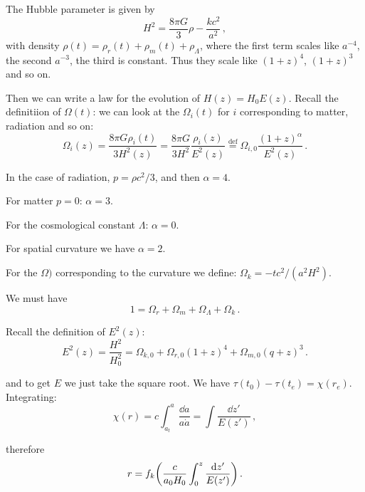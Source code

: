 \documentclass[main.tex]{subfiles}
\begin{document}

The Hubble parameter is given by 
%
\begin{equation}
  H^2= \frac{8 \pi G}{3} \rho - \frac{k c^2}{a^2}
\,,
\end{equation}
%
with density \(\rho (t) = \rho _r (t) + \rho _m (t) + \rho _\Lambda \), where the first term scales like \(a^{-4}\), the second \(a^{-3}\), the third is constant. Thus they scale like \((1+z)^{4}\), \((1+z)^{3}\) and so on.

Then we can write a law for the evolution of \(H(z) = H_0 E(z)\).
Recall the definitiion of \(\Omega (t)\): we can look at the \(\Omega_i (t)\) for \(i\) corresponding to matter, radiation and so on: 
%
\begin{equation}
  \Omega _i (z) = \frac{8 \pi G \rho _i (t)}{3 H^2(z)}
  = \frac{8 \pi G }{3 H^2} \frac{\rho _i (z)}{E^2(z)}
  \overset{\text{def}}{=} \Omega _{i,0} \frac{(1+z)^{\alpha }}{E^2(z)}
\,.
\end{equation}

In the case of radiation, \(p = \rho c^2 /3\), and then \(\alpha = 4\). 

For matter \(p=0\): \(\alpha = 3\).

For the cosmological constant \(\Lambda \): \(\alpha =0\).

For spatial curvature we have \(\alpha = 2\).

For the \(\Omega )\) corresponding to the curvature we define: \(\Omega _k = - t c^2/(a^2 H^2)\).

We must have 
%
\begin{equation}
  1 = \Omega _r + \Omega _m + \Omega _\Lambda + \Omega _k
\,.
\end{equation}

Recall the definition of \(E^2(z)\): 
%
\begin{equation}
  E^2(z) = \frac{H^2}{H_0^2} = 
  \Omega _{k, 0} + \Omega_{r, 0} (1+z)^4 + \Omega_{m, 0} (q+z)^{3}
\,.
\end{equation}

and to get \(E\) we just take the square root.
We have \(\tau (t_0 ) - \tau (t_e) = \chi (r_e)\).
Integrating: 
%
\begin{equation}
  \chi (r) = c \int_{a_t}^{a} \frac{\dd{a}  }{a \dot{a} }
  = \int \frac{\dd{z'} }{E(z')}
\,,
\end{equation}
%

therefore 
%
\begin{equation}
  r = f_k \qty(\frac{c}{a_0 H_0 } \int_0^z \frac{\dd{z'}   }{E(z')})
\,.
\end{equation}
%
\end{document}
